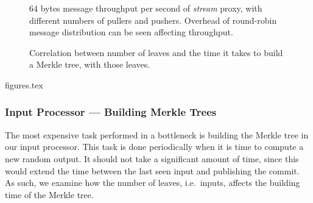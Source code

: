 \begin{figure}[tb]
    \centering
    \footnotesize
    \caption{%
        64 bytes message throughput per second of \textit{stream} proxy, with different numbers of pullers and pushers.
Overhead of round-robin message distribution can be seen affecting throughput.}%
\label{fig:proxy_throughput}
\end{figure}
\begin{figure}[tb]
    \centering\footnotesize
    \caption{Correlation between number of leaves and the time it takes to build a Merkle tree, with those leaves.}%
\label{fig:merkle_build}
\end{figure}
{figures.tex}
\subsubsection{Input Processor --- Building Merkle Trees}%
\label{ssub:input_processor_building_merkle_trees}
The most expensive task performed in a bottleneck is building the Merkle tree in our input processor.
This task is done periodically when it is time to compute a new random output.
It should not take a significant amount of time, since this would extend the time between the last seen input and publishing the commit.
As such, we examine how the number of leaves, i.e.\ inputs, affects the building time of the Merkle tree.

